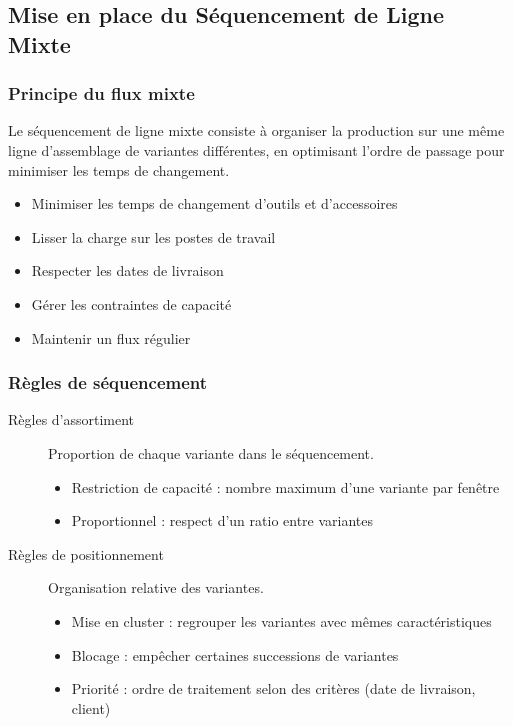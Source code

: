 \documentclass{article}
\begin{document}
\subsection{Mise en place du Séquencement de Ligne Mixte}

\subsubsection{Principe du flux mixte}

Le séquencement de ligne mixte consiste à organiser la production sur une même ligne d'assemblage de variantes différentes, en optimisant l'ordre de passage pour minimiser les temps de changement.

\begin{tcolorbox}[colback=grisclair, colframe=gray!70!black, title=Objectifs du séquencement mixte]
\begin{itemize}
    \item Minimiser les temps de changement d'outils et d'accessoires
    \item Lisser la charge sur les postes de travail
    \item Respecter les dates de livraison
    \item Gérer les contraintes de capacité
    \item Maintenir un flux régulier
\end{itemize}
\end{tcolorbox}

\subsubsection{Règles de séquencement}

\begin{description}
    \item[Règles d'assortiment] Proportion de chaque variante dans le séquencement.
    \begin{itemize}
        \item Restriction de capacité : nombre maximum d'une variante par fenêtre
        \item Proportionnel : respect d'un ratio entre variantes
    \end{itemize}
    
    \item[Règles de positionnement] Organisation relative des variantes.
    \begin{itemize}
        \item Mise en cluster : regrouper les variantes avec mêmes caractéristiques
        \item Blocage : empêcher certaines successions de variantes
        \item Priorité : ordre de traitement selon des critères (date de livraison, client)
    \end{itemize}
\end{description}
\end{document}
